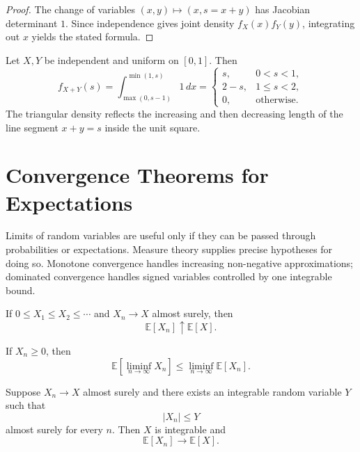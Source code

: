\begin{proof}
The change of variables $(x,y)\mapsto(x,s=x+y)$ has Jacobian determinant $1$. Since independence gives joint density $f_X(x)f_Y(y)$, integrating out $x$ yields the stated formula.
\end{proof}

\newpage

\begin{example}
Let $X,Y$ be independent and uniform on $[0,1]$. Then
\[
    f_{X+Y}(s)
    =\int_{\max(0,s-1)}^{\min(1,s)}1\,dx
    =
    \begin{cases}
    s,&0<s<1,\\
    2-s,&1\leq s<2,\\
    0,&\text{otherwise}.
    \end{cases}
\]
The triangular density reflects the increasing and then decreasing length of the line segment $x+y=s$ inside the unit square.
\end{example}

\section{Convergence Theorems for Expectations}

Limits of random variables are useful only if they can be passed through probabilities or expectations. Measure theory supplies precise hypotheses for doing so. Monotone convergence handles increasing non-negative approximations; dominated convergence handles signed variables controlled by one integrable bound.

\begin{theorem}
If $0\leq X_1\leq X_2\leq\cdots$ and $X_n\to X$ almost surely, then
\[
    \mathbb{E}[X_n]\uparrow\mathbb{E}[X].
\]
\end{theorem}

\begin{theorem}
If $X_n\geq0$, then
\[
    \mathbb{E}\left[\liminf_{n\to\infty}X_n\right]
    \leq
    \liminf_{n\to\infty}\mathbb{E}[X_n].
\]
\end{theorem}

\begin{theorem}
Suppose $X_n\to X$ almost surely and there exists an integrable random variable $Y$ such that
\[
    |X_n|\leq Y
\]
almost surely for every $n$. Then $X$ is integrable and
\[
    \mathbb{E}[X_n]\to\mathbb{E}[X].
\]
\end{theorem}

